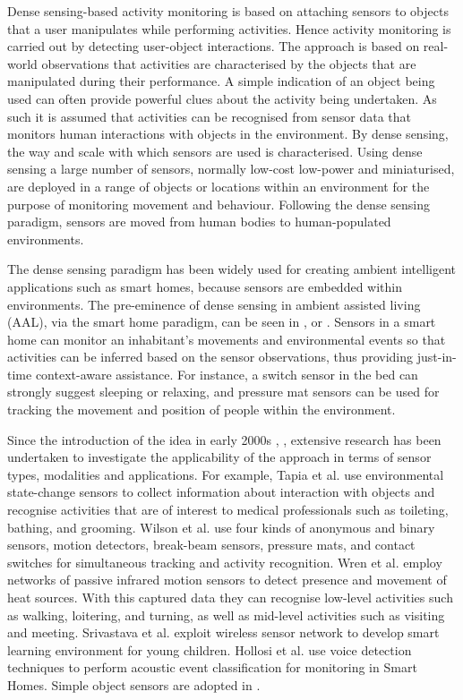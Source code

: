 Dense sensing-based activity monitoring is based on attaching sensors to objects that a user manipulates while performing activities. Hence activity monitoring is carried out by detecting user-object interactions. The approach is based on real-world observations that activities are characterised by the objects that are manipulated during their performance. A simple indication of an object being used can often provide powerful clues about the activity being undertaken. As such it is assumed that activities can be recognised from sensor data that monitors human interactions with objects in the environment. By dense sensing, the way and scale with which sensors are used is characterised. Using dense sensing a large number of sensors, normally low-cost low-power and miniaturised, are deployed in a range of objects or locations within an environment for the purpose of monitoring movement and behaviour. Following the dense sensing paradigm, sensors are moved from human bodies to human-populated environments.

The dense sensing paradigm has been widely used for creating ambient intelligent applications such as smart homes, because sensors are embedded within environments. The pre-eminence of dense sensing in ambient assisted living (AAL), via the smart home paradigm, can be seen in \cite{Chan2008}, \cite{Nugent2009} or \cite{Helal2005}. Sensors in a smart home can monitor an inhabitant’s movements and environmental events so that activities can be inferred based on the sensor observations, thus providing just-in-time context-aware assistance. For instance, a switch sensor in the bed can strongly suggest sleeping or relaxing, and pressure mat sensors can be used for tracking the movement and position of people within the environment.

Since the introduction of the idea in early 2000s \cite{Bao2004}, \cite{Patterson2003}, extensive research has been undertaken to investigate the applicability of the approach in terms of sensor types, modalities and applications. For example, Tapia et al. \cite{Tapia2004} use environmental state-change sensors to collect information about interaction with objects and recognise activities that are of interest to medical professionals such as toileting, bathing, and grooming. Wilson et al. \cite{Wilson2005} use four kinds of anonymous and binary sensors, motion detectors, break-beam sensors, pressure mats, and contact switches for simultaneous tracking and activity recognition. Wren et al. \cite{Wren2006} employ networks of passive infrared motion sensors to detect presence and movement of heat sources. With this captured data they can recognise low-level activities such as walking, loitering, and turning, as well as mid-level activities such as visiting and meeting. Srivastava et al. \cite{Srivastava2001} exploit wireless sensor network to develop smart learning environment for young children. Hollosi et al. \cite{Hollosi2010} use voice detection techniques to perform acoustic event classification for monitoring in Smart Homes. Simple object sensors are adopted in \cite{Aipperspach2006}.

